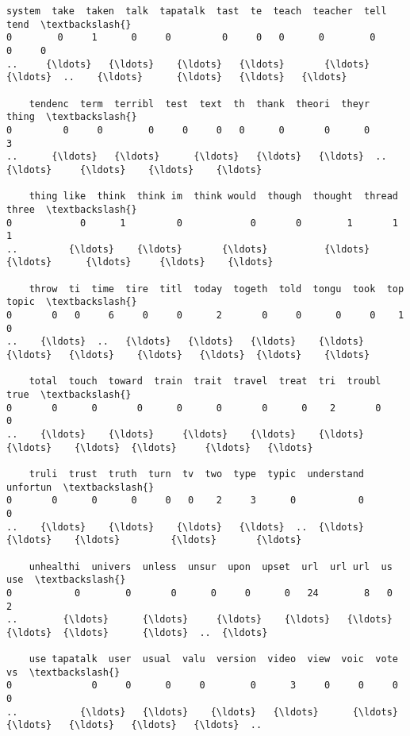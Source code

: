 \documentclass[11pt]{article}
\begin{document}
\begin{Verbatim}[commandchars=\\\{\}]
    system  take  taken  talk  tapatalk  tast  te  teach  teacher  tell  tend  \textbackslash{}
0        0     1      0     0         0     0   0      0        0     0     0   
..     {\ldots}   {\ldots}    {\ldots}   {\ldots}       {\ldots}   {\ldots}  ..    {\ldots}      {\ldots}   {\ldots}   {\ldots}   

    tendenc  term  terribl  test  text  th  thank  theori  theyr  thing  \textbackslash{}
0         0     0        0     0     0   0      0       0      0      3   
..      {\ldots}   {\ldots}      {\ldots}   {\ldots}   {\ldots}  ..    {\ldots}     {\ldots}    {\ldots}    {\ldots}   

    thing like  think  think im  think would  though  thought  thread  three  \textbackslash{}
0            0      1         0            0       0        1       1      1   
..         {\ldots}    {\ldots}       {\ldots}          {\ldots}     {\ldots}      {\ldots}     {\ldots}    {\ldots}   

    throw  ti  time  tire  titl  today  togeth  told  tongu  took  top  topic  \textbackslash{}
0       0   0     6     0     0      2       0     0      0     0    1      0   
..    {\ldots}  ..   {\ldots}   {\ldots}   {\ldots}    {\ldots}     {\ldots}   {\ldots}    {\ldots}   {\ldots}  {\ldots}    {\ldots}   

    total  touch  toward  train  trait  travel  treat  tri  troubl  true  \textbackslash{}
0       0      0       0      0      0       0      0    2       0     0   
..    {\ldots}    {\ldots}     {\ldots}    {\ldots}    {\ldots}     {\ldots}    {\ldots}  {\ldots}     {\ldots}   {\ldots}   

    truli  trust  truth  turn  tv  two  type  typic  understand  unfortun  \textbackslash{}
0       0      0      0     0   0    2     3      0           0         0   
..    {\ldots}    {\ldots}    {\ldots}   {\ldots}  ..  {\ldots}   {\ldots}    {\ldots}         {\ldots}       {\ldots}   

    unhealthi  univers  unless  unsur  upon  upset  url  url url  us  use  \textbackslash{}
0           0        0       0      0     0      0   24        8   0    2   
..        {\ldots}      {\ldots}     {\ldots}    {\ldots}   {\ldots}    {\ldots}  {\ldots}      {\ldots}  ..  {\ldots}   

    use tapatalk  user  usual  valu  version  video  view  voic  vote  vs  \textbackslash{}
0              0     0      0     0        0      3     0     0     0   0   
..           {\ldots}   {\ldots}    {\ldots}   {\ldots}      {\ldots}    {\ldots}   {\ldots}   {\ldots}   {\ldots}  ..   


\end{Verbatim}
\end{document}
